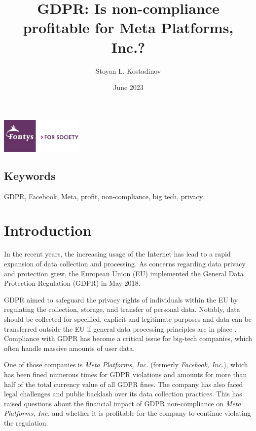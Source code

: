 \documentclass[12pt, a4paper]{article}
\title{GDPR: Is non-compliance profitable for Meta Platforms, Inc.?}
\author{Stoyan L. Kostadinov}
\date{June 2023}
\begin{document}
\maketitle



\begin{center}
    \includegraphics[width=0.3\textwidth]{fontys-logo}
\end{center}

\begin{abstract}
\end{abstract}

\subsection*{Keywords}

GDPR, Facebook, Meta, profit, non-compliance, big tech, privacy

\section*{Introduction}

In the recent years, the increasing usage of the Internet has lead to a rapid
expansion of data collection and processing\cite{}. As concerns regarding data
privacy and protection grew, the European Union (EU) implemented the General
Data Protection Regulation (GDPR) in May 2018\cite{}.

GDPR aimed to safeguard the privacy rights of individuals within the EU by
regulating the collection, storage, and transfer of personal data\cite{}.
Notably, data should be collected for specified, explicit and legitimate
purposes\cite{} and data can be transferred outside the EU if general data
processing principles are in place \cite{}. Compliance with GDPR has become a
critical issue for big-tech companies, which often handle massive amounts of
user data.

One of those companies is \textit{Meta Platforms, Inc.} (formerly
\textit{Facebook, Inc.}), which has been fined numerous times for GDPR
violations and amounts for more than half of the total currency value of all
GDPR fines\cite{}. The company has also faced legal challenges and public
backlash over its data collection practices\cite{}. This has raised questions
about the financial impact of GDPR non-compliance on \textit{Meta Platforms,
Inc.} and whether it is profitable for the company to continue violating the
regulation.
\end{document}
